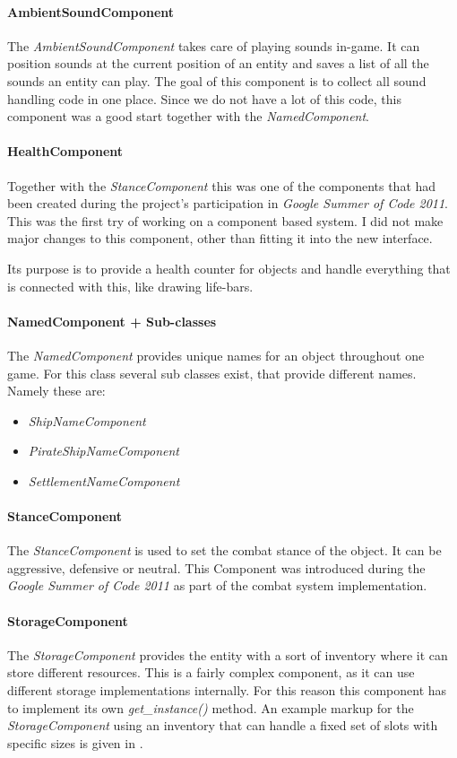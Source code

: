 \paragraph{AmbientSoundComponent}
The \textit{AmbientSoundComponent} takes care of playing sounds in-game. It can position sounds at the current position
of an entity and saves a list of all the sounds an entity can play. The goal of this component is to collect all sound
handling code in one place. Since we do not have a lot of this code, this component was a good start together with the
\textit{NamedComponent}.

\paragraph{HealthComponent}
Together with the \textit{StanceComponent} this was one of the components that had been created during the project's
participation in \textit{Google Summer of Code 2011}. This was the first try of working on a component based system. I
did not make major changes to this component, other than fitting it into the new interface.

Its purpose is to provide a health counter for objects and handle everything that is connected with this, like drawing
life-bars.

\paragraph{NamedComponent + Sub-classes}
The \textit{NamedComponent} provides unique names for an object throughout one game. For this class several sub classes
exist, that provide different names. Namely these are:
\begin{itemize}
    \item \textit{ShipNameComponent}
    \item \textit{PirateShipNameComponent}
    \item \textit{SettlementNameComponent}
\end{itemize}

\paragraph{StanceComponent}
The \textit{StanceComponent} is used to set the combat stance of the object. It can be aggressive, defensive or neutral.
This Component was introduced during the \textit{Google Summer of Code 2011} as part of the combat system
implementation.

\paragraph{StorageComponent}
The \textit{StorageComponent} provides the entity with a sort of inventory where it can store different resources. This
is a fairly complex component, as it can use different storage implementations internally. For this reason this
component has to implement its own \textit{get\_instance()} method. An example markup for the \textit{StorageComponent}
using an inventory that can handle a fixed set of slots with specific sizes is given in .

